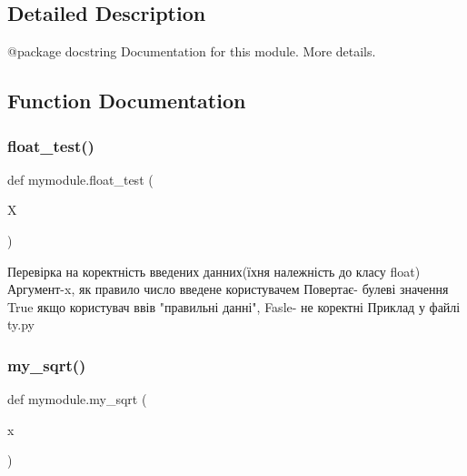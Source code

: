 \subsection{Detailed Description}
\begin{DoxyVerb}@package docstring
Documentation for this module.
More details.
\end{DoxyVerb}
 

\subsection{Function Documentation}
\mbox{\label{namespacemymodule_a95bb68754e76a49c40edd5dc05c24bdd}} 
\subsubsection{\texorpdfstring{float\+\_\+test()}{float\_test()}}
{\footnotesize\ttfamily def mymodule.\+float\+\_\+test (\begin{DoxyParamCaption}\item[{}]{X }\end{DoxyParamCaption})}

\begin{DoxyVerb}    Перевірка на коректність введених данних(їхня належність до класу float)
    Аргумент-x, як правило число введене користувачем
    Повертає- булеві значення True якщо користувач ввів "правильні данні", Fasle- не коректні 
    Приклад у файлі ty.py\end{DoxyVerb}
 \mbox{\label{namespacemymodule_acbe5bf6a26ef15cacf89de54f5ce9e2c}} 
\subsubsection{\texorpdfstring{my\+\_\+sqrt()}{my\_sqrt()}}
{\footnotesize\ttfamily def mymodule.\+my\+\_\+sqrt (\begin{DoxyParamCaption}\item[{}]{x }\end{DoxyParamCaption})}

\mbox{\label{namespacemymodule_a12cb324c71a9dfc9bd08f36864f77acf}} 
